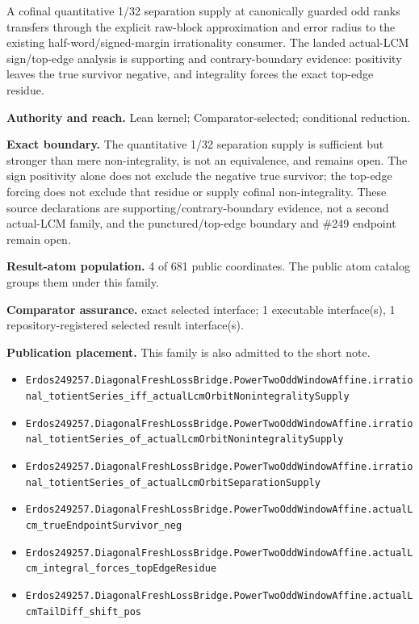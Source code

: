 A cofinal quantitative 1/32 separation supply at canonically guarded odd ranks transfers through the explicit raw-block approximation and error radius to the existing half-word/signed-margin irrationality consumer. The landed actual-LCM sign/top-edge analysis is supporting and contrary-boundary evidence: positivity leaves the true survivor negative, and integrality forces the exact top-edge residue.

\textbf{Authority and reach.} Lean kernel; Comparator-selected; conditional reduction.

\textbf{Exact boundary.} The quantitative 1/32 separation supply is sufficient but stronger than mere non-integrality, is not an equivalence, and remains open. The sign positivity alone does not exclude the negative true survivor; the top-edge forcing does not exclude that residue or supply cofinal non-integrality. These source declarations are supporting/contrary-boundary evidence, not a second actual-LCM family, and the punctured/top-edge boundary and \#249 endpoint remain open.

\textbf{Result-atom population.} 4 of 681 public coordinates. The public atom catalog groups them under this family.

\textbf{Comparator assurance.} exact selected interface; 1 executable interface(s), 1 repository-registered selected result interface(s).

\textbf{Publication placement.} This family is also admitted to the short note.

\begin{itemize}
  \item \nolinkurl{Erdos249257.DiagonalFreshLossBridge.PowerTwoOddWindowAffine.irrational_totientSeries_iff_actualLcmOrbitNonintegralitySupply}
  \item \nolinkurl{Erdos249257.DiagonalFreshLossBridge.PowerTwoOddWindowAffine.irrational_totientSeries_of_actualLcmOrbitNonintegralitySupply}
  \item \nolinkurl{Erdos249257.DiagonalFreshLossBridge.PowerTwoOddWindowAffine.irrational_totientSeries_of_actualLcmOrbitSeparationSupply}
  \item \nolinkurl{Erdos249257.DiagonalFreshLossBridge.PowerTwoOddWindowAffine.actualLcm_trueEndpointSurvivor_neg}
  \item \nolinkurl{Erdos249257.DiagonalFreshLossBridge.PowerTwoOddWindowAffine.actualLcm_integral_forces_topEdgeResidue}
  \item \nolinkurl{Erdos249257.DiagonalFreshLossBridge.PowerTwoOddWindowAffine.actualLcmTailDiff_shift_pos}
\end{itemize}

